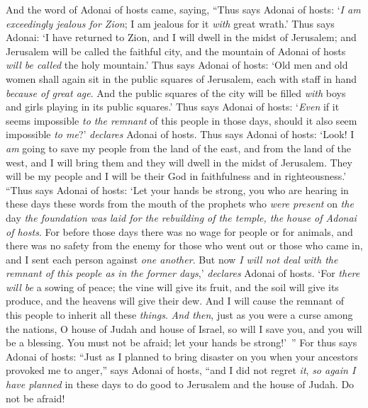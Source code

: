 \begin{biblechapter} %
 And the word of Adonai of hosts came, saying,
\verse “Thus says Adonai of hosts: ‘\textit{I am exceedingly jealous for Zion}; I am jealous for it \textit{with} great wrath.’
\verse Thus says Adonai: ‘I have returned to Zion, and I will dwell in the midst of Jerusalem; and Jerusalem will be called the faithful city, and the mountain of Adonai of hosts \textit{will be called} the holy mountain.’
\verse Thus says Adonai of hosts: ‘Old men and old women shall again sit in the public squares of Jerusalem, each with staff in hand \textit{because of great age}.
\verse And the public squares of the city will be filled \textit{with} boys and girls playing in its public squares.’
\verse Thus says Adonai of hosts: ‘\textit{Even} if it seems impossible \textit{to the remnant} of this people in those days, should it also seem impossible \textit{to me}?’ \textit{declares} Adonai of hosts.
\verse Thus says Adonai of hosts: ‘Look! I \textit{am} going to save my people from the land of the east, and from the land of the west,
\verse and I will bring them and they will dwell in the midst of Jerusalem. They will be my people and I will be their God in faithfulness and in righteousness.’
\verse “Thus says Adonai of hosts: ‘Let your hands be strong, you who are hearing in these days these words from the mouth of the prophets who \textit{were present} on \textit{the} day \textit{the foundation was laid for the rebuilding of the temple, the house of Adonai of hosts}.
\verse For before those days there was no wage for people or for animals, and there was no safety from the enemy for those who went out or those who came in, and I sent each person against \textit{one another}.
\verse But now \textit{I will not deal with the remnant of this people as in the former days},’ \textit{declares} Adonai of hosts.
\verse ‘For \textit{there will be} a sowing of peace; the vine will give its fruit, and the soil will give its produce, and the heavens will give their dew. And I will cause the remnant of this people to inherit all these \textit{things}.
\verse \textit{And then}, just as you were a curse among the nations, O house of Judah and house of Israel, so will I save you, and you will be a blessing. You must not be afraid; let your hands be strong!’ ”
\verse For thus says Adonai of hosts: “Just as I planned to bring disaster on you when your ancestors provoked me to anger,” says Adonai of hosts, “and I did not regret \textit{it},
\verse \textit{so again I have planned} in these days to do good to Jerusalem and the house of Judah. Do not be afraid!

\end{biblechapter}
